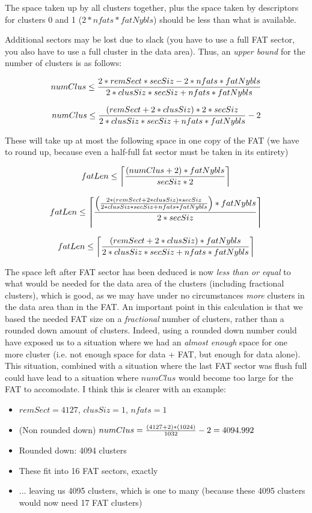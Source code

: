 \documentclass[a4paper,12pt]{article}
\begin{document}
The space taken up by all clusters together, plus the space taken by
descriptors for clusters 0 and 1 ($2*nfats*fatNybls$) should be less
than what is available.

Additional sectors may be lost due to slack (you have to use a full
FAT sector, you also have to use a full cluster in the data
area). Thus, an {\em upper bound} for the number of clusters is as
follows:

$$
numClus \le  {2*remSect*secSiz - 2*nfats*fatNybls \over
2*clusSiz*secSiz + nfats*fatNybls}
$$

	                        
$$
numClus \le {(remSect+2*clusSiz)*2*secSiz \over
2*clusSiz*secSiz + nfats*fatNybls} - 2
$$

	   
These will take up at most the following space in one copy of the FAT
(we have to round up, because even a half-full fat sector must be
taken in its entirety)

$$
fatLen \le \left\lceil {  (numClus+2)*fatNybls \over secSiz * 2 } \right\rceil
$$


$$
fatLen \le \left\lceil {
\left( { 2*(remSect+2*clusSiz)*secSiz \over
2*clusSiz*secSiz + nfats*fatNybls} \right) * fatNybls \over
2*secSiz 
} \right\rceil
$$


$$
fatLen \le \left\lceil {
(remSect+2*clusSiz)* fatNybls \over
2*clusSiz*secSiz + nfats*fatNybls
} \right\rceil
$$

The space left after FAT sector has been deduced is now {\em less than
or equal} to what would be needed for the data area of the clusters
(including fractional clusters), which is good, as we may have under
no circumstances {\em more} clusters in the data area than in the FAT.
An important point in this calculation is that we based the needed FAT
size on a {\em fractional} number of clusters, rather than a rounded
down amount of clusters. Indeed, using a rounded down number could
have exposed us to a situation where we had an {\em almost enough}
space for one more cluster (i.e. not enough space for data + FAT, but
enough for data alone). This situation, combined with a situation
where the last FAT sector was flush full could have lead to a
situation where $numClus$ would become too large for the FAT to
accomodate. I think this is clearer with an example:
\begin{itemize}
\item $remSect=4127$, $clusSiz=1$, $nfats=1$
\item (Non rounded down) $numClus={(4127+2)*(1024) \over 1032} -
2 =4094.992$
\item Rounded down: 4094 clusters
\item These fit into 16 FAT sectors, exactly
\item ... leaving us 4095 clusters, which is one to many (because
these 4095 clusters would now need 17 FAT clusters)
\end{itemize}
\end{document}
